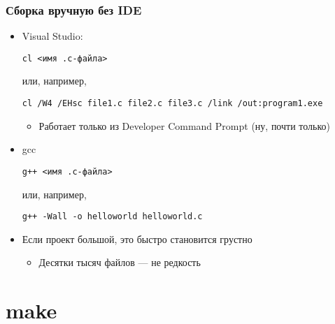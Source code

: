 \documentclass{../../slides-style}
\begin{document}
    \begin{frame}[fragile]
        \frametitle{Сборка вручную без IDE}
        \begin{itemize}
            \item Visual Studio:
            \begin{footnotesize}
                \begin{verbatim}
cl <имя .c-файла>
                \end{verbatim}
            \end{footnotesize}
            или, например,
            \begin{footnotesize}
                \begin{verbatim}
cl /W4 /EHsc file1.c file2.c file3.c /link /out:program1.exe
                \end{verbatim}
            \end{footnotesize}
            \begin{itemize}
                \item Работает только из Developer Command Prompt (ну, почти только)
            \end{itemize}
            \item gcc
            \begin{footnotesize}
                \begin{verbatim}
g++ <имя .c-файла>
                \end{verbatim}
            \end{footnotesize}
            или, например,
            \begin{footnotesize}
                \begin{verbatim}
g++ -Wall -o helloworld helloworld.c
                \end{verbatim}
            \end{footnotesize}
            \item Если проект большой, это быстро становится грустно
            \begin{itemize}
                \item Десятки тысяч файлов --- не редкость
            \end{itemize}
        \end{itemize}
    \end{frame}

    \section{make}
\end{document}

